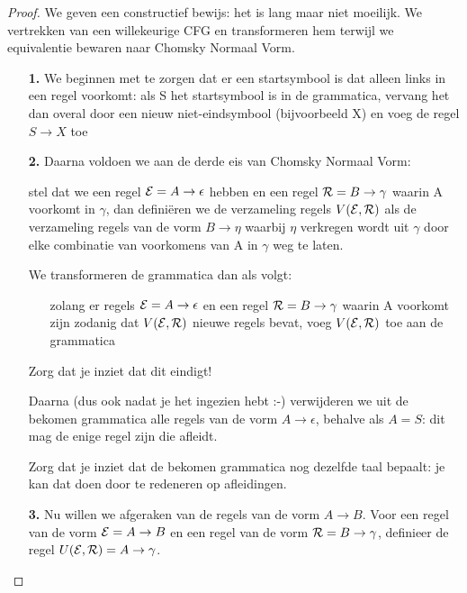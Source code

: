 \begin{proof}
We geven een constructief bewijs: het is lang maar niet moeilijk. We
vertrekken van een willekeurige CFG en transformeren hem terwijl we
equivalentie bewaren naar Chomsky Normaal Vorm.

\begin{enumerate}
\item[{\bf 1.}] We beginnen met te zorgen dat er een startsymbool is
dat alleen links in een regel voorkomt: als S het startsymbool is in
de grammatica, vervang het dan overal door een nieuw niet-eindsymbool
(bijvoorbeeld X) en voeg de regel $S \rightarrow X$ toe 

\item[{\bf 2.}] Daarna voldoen we aan de derde eis van Chomsky Normaal Vorm:

stel dat we een regel ${\cal E} = A \rightarrow \epsilon$ hebben en
een regel ${\cal R} = B \rightarrow \gamma$ waarin A voorkomt in
$\gamma$, dan defini\"eren we de verzameling regels $V({\cal E},{\cal
R})$ als de verzameling regels van de vorm $B \rightarrow \eta$
waarbij $\eta$ verkregen wordt uit $\gamma$ door elke combinatie van
voorkomens van A in $\gamma$ weg te laten.  

We transformeren de grammatica dan als volgt:

\begin{itemize}
\item[]
zolang er regels ${\cal E} = A \rightarrow \epsilon$ en
een regel ${\cal R} = B \rightarrow \gamma$ waarin A voorkomt zijn
zodanig dat $V({\cal E},{\cal R})$ nieuwe regels bevat, voeg $V({\cal
E},{\cal R})$ toe aan de grammatica
\end{itemize}
Zorg dat je inziet dat dit eindigt!


Daarna (dus ook nadat je het ingezien hebt :-) verwijderen we uit de
bekomen grammatica alle regels van de vorm $A \rightarrow \epsilon$,
behalve als $A = S$: dit mag de enige regel zijn die \eps afleidt.


Zorg dat je inziet dat de bekomen grammatica nog dezelfde taal
bepaalt: je kan dat doen door te redeneren op afleidingen.


\item[{\bf 3.}] Nu willen we afgeraken van de regels van de vorm $A \rightarrow B$. 
Voor een regel van de vorm ${\cal E} = A \rightarrow B$ en een regel
van de vorm ${\cal R} = B \rightarrow \gamma$, definieer de regel
$U({\cal E},{\cal R}) = A \rightarrow \gamma$.


\end{enumerate}
\end{proof}
